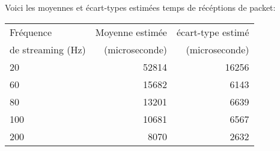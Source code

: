 Voici les moyennes et écart-types estimées temps de récéptions de packet:\\ %

\begin{center}
\begin{tabular}{|l|r|r|}
 \hline
 Fréquence & Moyenne estimée & écart-type estimé\\
 de streaming (Hz) & (microseconde) & (microseconde)\\
 \hline
 20 & 52814 & 16256\\
 60 & 15682 & 6143\\
 80 & 13201 & 6639\\
 100 & 10681 & 6567\\
 200 & 8070 & 2632\\
 \hline
\end{tabular}
\end{center}
